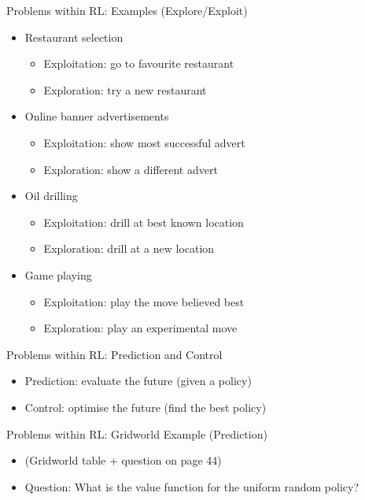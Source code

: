 \documentclass[presentation]{beamer}
\begin{document}
\begin{frame}[label={sec:org983d45d}]{Problems within RL: Examples (Explore/Exploit)}
\begin{itemize}
\item Restaurant selection
\begin{itemize}
\item Exploitation: go to favourite restaurant
\item Exploration: try a new restaurant
\end{itemize}
\item Online banner advertisements
\begin{itemize}
\item Exploitation: show most successful advert
\item Exploration: show a different advert
\end{itemize}
\item Oil drilling
\begin{itemize}
\item Exploitation: drill at best known location
\item Exploration: drill at a new location
\end{itemize}
\item Game playing
\begin{itemize}
\item Exploitation: play the move believed best
\item Exploration: play an experimental move
\end{itemize}
\end{itemize}
\end{frame}
\begin{frame}[label={sec:org76d58ba}]{Problems within RL: Prediction and Control}
\begin{itemize}
\item Prediction: evaluate the future (given a policy)
\item Control: optimise the future (find the best policy)
\end{itemize}
\end{frame}
\begin{frame}[label={sec:org5ae3cb8}]{Problems within RL: Gridworld Example (Prediction)}
\begin{itemize}
\item (Gridworld table + question on page 44)
\item Question: What is the value function for the uniform random policy?
\end{itemize}
\end{frame}
\end{document}
